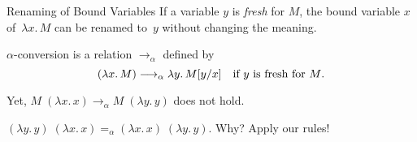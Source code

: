 \begin{frame}{Renaming of Bound Variables}
If a variable $y$ is \emph{fresh} for $M$, the bound variable $x$ of~$\lambda
x.\, M$ can be renamed to~$y$ without changing the meaning. 
\begin{definition}
  $\alpha$-conversion is a relation $\to_\alpha$ defined by
  \[
    (\lambda x.\, M) \longrightarrow_\alpha \lambda y.\, M\subst{y}{x}
    \quad\text{if $y$ is fresh for $M$}.
  \]
\end{definition}

Yet, $M\;(\lambda x.\, x) \longrightarrow_\alpha M\;(\lambda y.\, y)$ does not hold.
\end{frame}

\begin{frame}
  \begin{definition}
  \begin{multicols}{2}
    \begin{prooftree}
    \end{prooftree}
    \begin{prooftree}
    \end{prooftree}
    \begin{prooftree}
    \end{prooftree}
    \begin{prooftree}
    \end{prooftree}
    \begin{prooftree}
    \end{prooftree}
    \begin{prooftree}
    \end{prooftree}
  \end{multicols}
\end{definition}

  $(\lambda y.\, y)\;(\lambda x.\, x) =_\alpha (\lambda x.\,x)\;(\lambda y.\,y)$. Why? Apply our rules! 
\end{frame}

